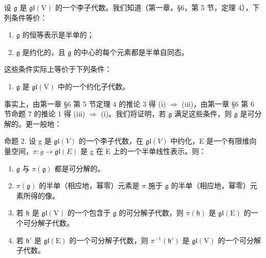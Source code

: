 设 \(\mathfrak{g}\) 是 \(\mathfrak{gl}(\mathrm{V})\) 的一个李子代数。我们知道（第一章，§6，第 5 节，定理 4），下列条件等价：

\begin{enumerate}
\def\labelenumi{(\roman{enumi})}
\item
  \(\mathfrak{g}\) 的恒等表示是半单的；
\item
  \(\mathfrak{g}\) 是约化的，且 \(\mathfrak{g}\) 的中心的每个元素都是半单自同态。
\end{enumerate}

这些条件实际上等价于下列条件：

\begin{enumerate}
\def\labelenumi{(\roman{enumi})}
\setcounter{enumi}{2}
\tightlist
\item
  \(\mathfrak{g}\) 是 \(\mathfrak{gl}(\mathrm{V})\) 中的一个约化子代数。
\end{enumerate}

事实上，由第一章 §6 第 5 节定理 4 的推论 3 得 (i) \(\Longrightarrow\) (iii)，由第一章 §6 第 6 节命题 7 的推论 1 得 (iii) \(\Longrightarrow\) (i)。我们将证明，若 \(\mathfrak{g}\) 满足这些条件，则 \(\mathfrak{g}\) 是可分解的。更一般地：

命题 2. 设 g 是 \(\mathfrak{gl}(V)\) 的一个李子代数，在 \(\mathfrak{gl}(V)\) 中约化，E 是一个有限维向量空间，\(\pi : g \to \mathfrak{gl}(E)\) 是 g 在 E 上的一个半单线性表示。则：

\begin{enumerate}
\def\labelenumi{(\roman{enumi})}
\item
  \(\mathfrak{g}\) 与 \(\pi (\mathfrak{g})\) 都是可分解的。
\item
  \(\pi(\mathfrak{g})\) 的半单（相应地，幂零）元素是 \(\pi\) 施于 \(\mathfrak{g}\) 的半单（相应地，幂零）元素所得的像。
\item
  若 \(\mathfrak{h}\) 是 \(\mathfrak{gl}(\mathrm{V})\) 的一个包含于 \(\mathfrak{g}\) 的可分解子代数，则 \(\pi(\mathfrak{h})\) 是 \(\mathfrak{gl}(\mathrm{E})\) 的一个可分解子代数。
\item
  若 \(\mathfrak{h}'\) 是 \(\mathfrak{gl}(\mathrm{E})\) 的一个可分解子代数，则 \(\pi^{-1}(\mathfrak{h}')\) 是 \(\mathfrak{gl}(\mathrm{V})\) 的一个可分解子代数。
\end{enumerate}

